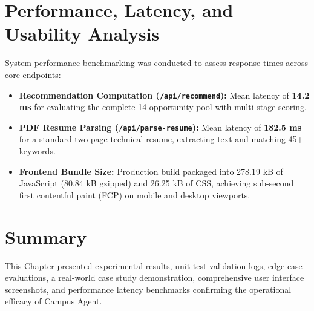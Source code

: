 \section{Performance, Latency, and Usability Analysis} \label{S6.6}
System performance benchmarking was conducted to assess response times across core endpoints:
\begin{itemize}
	\item \textbf{Recommendation Computation (\texttt{/api/recommend}):} Mean latency of \textbf{14.2 ms} for evaluating the complete 14-opportunity pool with multi-stage scoring.
	\item \textbf{PDF Resume Parsing (\texttt{/api/parse-resume}):} Mean latency of \textbf{182.5 ms} for a standard two-page technical resume, extracting text and matching 45+ keywords.
	\item \textbf{Frontend Bundle Size:} Production build packaged into 278.19 kB of JavaScript (80.84 kB gzipped) and 26.25 kB of CSS, achieving sub-second first contentful paint (FCP) on mobile and desktop viewports.
\end{itemize}

\section{Summary} \label{S6.7}
This Chapter presented experimental results, unit test validation logs, edge-case evaluations, a real-world case study demonstration, comprehensive user interface screenshots, and performance latency benchmarks confirming the operational efficacy of Campus Agent.
